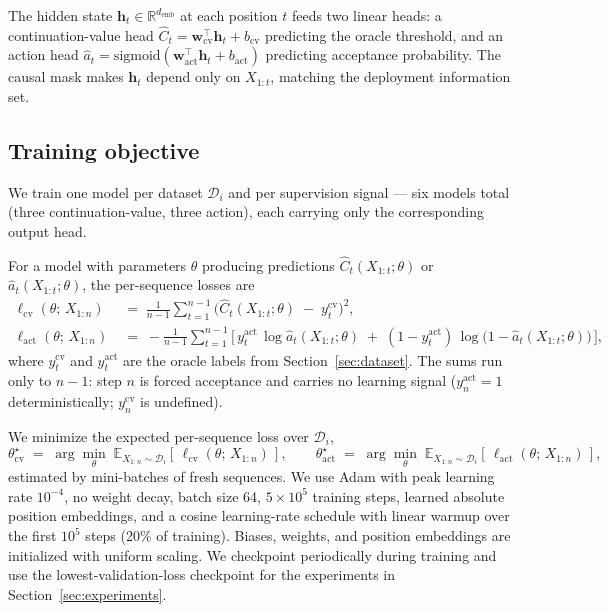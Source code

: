 \documentclass[11pt]{article}
\begin{document}
The hidden state $\mathbf{h}_t \in \mathbb{R}^{d_{\mathrm{emb}}}$ at each position $t$ feeds two linear heads: a continuation-value head $\widehat{C}_t = \mathbf{w}_{\mathrm{cv}}^\top \mathbf{h}_t + b_{\mathrm{cv}}$ predicting the oracle threshold, and an action head $\hat a_t = \mathrm{sigmoid}(\mathbf{w}_{\mathrm{act}}^\top \mathbf{h}_t + b_{\mathrm{act}})$ predicting acceptance probability. The causal mask makes $\mathbf{h}_t$ depend only on $X_{1:t}$, matching the deployment information set.

\subsection{Training objective}

We train one model per dataset $\mathcal{D}_i$ and per supervision signal --- six models total (three continuation-value, three action), each carrying only the corresponding output head.

For a model with parameters $\theta$ producing predictions $\widehat{C}_t(X_{1:t};\theta)$ or $\hat a_t(X_{1:t};\theta)$, the per-sequence losses are
\begin{align*}
\ell_{\mathrm{cv}}(\theta;\, X_{1:n})
&\;=\; \frac{1}{n-1}\sum_{t=1}^{n-1}\Big(\widehat{C}_t(X_{1:t};\theta) \;-\; y_t^{\mathrm{cv}}\Big)^{\!2}, \\
\ell_{\mathrm{act}}(\theta;\, X_{1:n})
&\;=\; -\frac{1}{n-1}\sum_{t=1}^{n-1}\!\Big[\, y_t^{\mathrm{act}}\,\log \hat a_t(X_{1:t};\theta) \;+\; (1 - y_t^{\mathrm{act}})\,\log\!\big(1 - \hat a_t(X_{1:t};\theta)\big)\,\Big],
\end{align*}
where $y_t^{\mathrm{cv}}$ and $y_t^{\mathrm{act}}$ are the oracle labels from Section~\ref{sec:dataset}. The sums run only to $n-1$: step $n$ is forced acceptance and carries no learning signal ($y_n^{\mathrm{act}} = 1$ deterministically; $y_n^{\mathrm{cv}}$ is undefined).

We minimize the expected per-sequence loss over $\mathcal{D}_i$,
\[
\theta^\star_{\mathrm{cv}} \;=\; \arg\min_\theta\; \mathbb{E}_{X_{1:n}\sim\mathcal{D}_i}\!\left[\,\ell_{\mathrm{cv}}(\theta;\,X_{1:n})\,\right],
\qquad
\theta^\star_{\mathrm{act}} \;=\; \arg\min_\theta\; \mathbb{E}_{X_{1:n}\sim\mathcal{D}_i}\!\left[\,\ell_{\mathrm{act}}(\theta;\,X_{1:n})\,\right],
\]
estimated by mini-batches of fresh sequences. We use Adam with peak learning rate $10^{-4}$, no weight decay, batch size 64, $5\times 10^5$ training steps, learned absolute position embeddings, and a cosine learning-rate schedule with linear warmup over the first $10^5$ steps (20\% of training). Biases, weights, and position embeddings are initialized with uniform scaling. We checkpoint periodically during training and use the lowest-validation-loss checkpoint for the experiments in Section~\ref{sec:experiments}.
\end{document}
